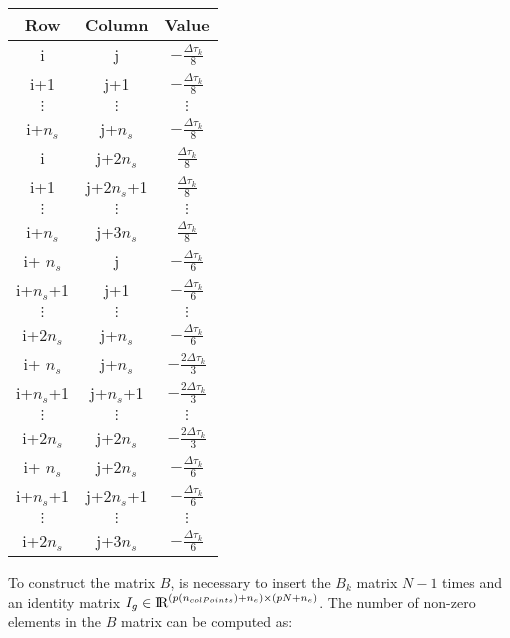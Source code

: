 \documentclass[12pt]{article}
\newcommand{\real}{\mbox{\rm I$\!$R}}
\begin{document}
\begin{table}[h]
\begin{center}
\begin{tabular}{c|c|c}
Row    & Column        & Value \\ \hline
i      & j             & $-\frac{\Delta \tau_k}{8}$    \\
i+1    & j+1           & $-\frac{\Delta \tau_k}{8}$    \\
$\vdots$ & $\vdots$   &    $\vdots$     \\
i+$n_s$ & j+$n_s$        & $-\frac{\Delta \tau_k}{8}$    \\
%
i      & j+$2n_s$  & $\frac{\Delta \tau_k}{8}$     \\
i+1    & j+$2n_s$+1 & $\frac{\Delta \tau_k}{8}$     \\
 $\vdots$ & $\vdots$     &    $\vdots$     \\
i+$n_s$ & j+$3n_s$  & $\frac{\Delta \tau_k}{8}$\\
%
i+ $n_s$      & j             & $-\frac{\Delta \tau_k}{6}$    \\
i+$n_s$+1    & j+1           & $-\frac{\Delta \tau_k}{6}$    \\
$\vdots$ & $\vdots$   &    $\vdots$     \\
i+$2n_s$ & j+$n_s$        & $-\frac{\Delta \tau_k}{6}$    \\
%
i+ $n_s$      & j+$n_s$             & $-\frac{2\Delta \tau_k}{3}$    \\
i+$n_s$+1    & j+$n_s$+1           & $-\frac{2\Delta \tau_k}{3}$    \\
$\vdots$ & $\vdots$   &    $\vdots$     \\
i+$2n_s$ & j+$2n_s$        & $-\frac{2\Delta \tau_k}{3}$    \\
%
i+ $n_s$      & j+$2n_s$             & $-\frac{\Delta \tau_k}{6}$    \\
i+$n_s$+1    & j+$2n_s$+1           & $-\frac{\Delta \tau_k}{6}$    \\
$\vdots$ & $\vdots$   &    $\vdots$     \\
i+$2n_s$ & j+$3n_s$        & $-\frac{\Delta \tau_k}{6}$    \\
\end{tabular}
\end{center}
\end{table}

To construct the matrix $B$, is necessary to insert the $B_k$ matrix $N-1$ times and an identity matrix $I_g \in \real^{(p(n_{colPoints})+n_e) \times (pN+n_e) }$. The number of non-zero elements in the $B$ matrix can be computed as:
\end{document}
